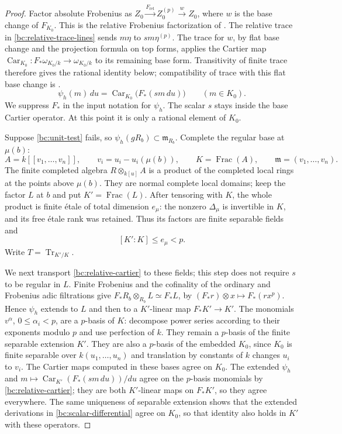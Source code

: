 \begin{proof}
Factor absolute Frobenius as
$Z_0\xrightarrow{F_{\mathrm{rel}}}Z_0^{(p)}
 \xrightarrow{w}Z_0$, where $w$ is the base change of $F_{K_0}$.
This is the relative Frobenius factorization of
\cite[Tag 0CC6]{StacksProject}.
The relative trace in \eqref{bc:relative-trace-lines} sends
$m\eta$ to $sm\eta^{(p)}$.  The trace for $w$, by flat base change and
the projection formula on top forms, applies the Cartier map
$\operatorname{Car}_{K_0}:F_*\omega_{K_0/k}\to\omega_{K_0/k}$
to its remaining base form.  Transitivity of finite trace therefore
gives the rational identity below; compatibility of trace with this
flat base change is \cite[Tag 0E5L]{StacksProject}.
\begin{equation}\label{bc:relative-cartier}
 \psi_h(m)\,du
       =\operatorname{Car}_{K_0}\bigl(F_*(s m\,du)\bigr)
       \qquad(m\in K_0).
\end{equation}
We suppress $F_*$ in the input notation for $\psi_h$.  The scalar
$s$ stays inside the base Cartier operator.  At this point it is only
a rational element of $K_0$.

Suppose \eqref{bc:unit-test} fails, so
$\psi_h(gR_b)\subset\mathfrak m_{R_b}$.  Complete the regular base at
$\mu(b)$:
\[
 A=k[[v_1,\ldots,v_n]],\qquad v_i=u_i-u_i(\mu(b)),\qquad
 K=\operatorname{Frac}(A),\qquad \mathfrak m=(v_1,\ldots,v_n).
\]
The finite completed algebra $R\otimes_{k[u]}A$ is a product of the
completed local rings at the points above $\mu(b)$.  They are normal
complete local domains; keep the factor $L$ at $b$ and put
$K'=\operatorname{Frac}(L)$.  After tensoring with $K$, the whole
product is finite \'{e}tale of total dimension $e_\mu$: the nonzero
$\Delta_\mu$ is invertible in $K$, and its free \'{e}tale rank was
retained.  Thus its factors are finite separable fields and
\begin{equation}\label{bc:completed-degree}
       [K':K]\le e_\mu<p.
\end{equation}
Write $T=\operatorname{Tr}_{K'/K}$.

We next transport \eqref{bc:relative-cartier} to these fields; this step
does not require $s$ to be regular in $L$.  Finite Frobenius and the
cofinality of the ordinary and Frobenius adic filtrations give
$F_*R_b\otimes_{R_b}L\simeq F_*L$, by
$(F_*r)\otimes x\mapsto F_*(rx^p)$.  Hence $\psi_h$ extends to $L$
and then to a $K'$-linear map $F_*K'\to K'$.  The monomials
$v^\alpha$, $0\le\alpha_i<p$, are a $p$-basis of $K$: decompose power
series according to their exponents modulo $p$ and use perfection of
$k$.  They remain a $p$-basis of the finite separable extension $K'$.
They are also a $p$-basis of the embedded $K_0$, since $K_0$ is finite
separable over $k(u_1,\ldots,u_n)$ and translation by constants of
$k$ changes $u_i$ to $v_i$.  The Cartier maps computed in these bases
agree on $K_0$.  The extended $\psi_h$ and
$m\mapsto\operatorname{Car}_{K'}(F_*(sm\,du))/du$ agree on the
$p$-basis monomials by \eqref{bc:relative-cartier}; they are both
$K'$-linear maps on $F_*K'$, so they agree everywhere.  The same
uniqueness of separable extension shows that the extended derivations
in \eqref{bc:scalar-differential} agree on $K_0$, so that identity also
holds in $K'$ with these operators.


\end{proof}
